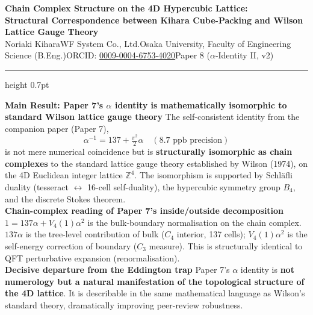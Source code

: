 \documentclass[9pt,a4paper]{article}
\begin{document}
\begin{center}
{\Large\bfseries Chain Complex Structure on the 4D Hypercubic Lattice:\\ Structural Correspondence between Kihara Cube-Packing and Wilson Lattice Gauge Theory}\\[2pt]
{\small Noriaki Kihara\enspace WF System Co., Ltd.\enspace Osaka University, Faculty of Engineering Science (B.Eng.)\enspace ORCID: \href{https://orcid.org/0009-0004-6753-4020}{0009-0004-6753-4020}\enspace Paper 8 ($\alpha$-Identity II, v2)}
\end{center}

\vspace{-1pt}
\hrule height 0.7pt
\vspace{4pt}

\begin{tcolorbox}[colback=gray!7,colframe=gray!55,boxrule=0.4pt,arc=2pt,left=4pt,right=4pt,top=2pt,bottom=2pt]
{\small
\textbf{Main Result: Paper 7's $\alpha$ identity is mathematically isomorphic to standard Wilson lattice gauge theory}\enspace
The self-consistent identity from the companion paper (Paper 7),
\[ \alpha^{-1} = 137 + \tfrac{\pi^2}{2}\alpha \quad (\text{8.7 ppb precision}) \]
is not mere numerical coincidence but is \textbf{structurally isomorphic as chain complexes} to the standard lattice gauge theory established by Wilson (1974), on the 4D Euclidean integer lattice $\mathbb{Z}^4$. The isomorphism is supported by Schl\"afli duality (tesseract $\leftrightarrow$ 16-cell self-duality), the hypercubic symmetry group $B_4$, and the discrete Stokes theorem.\\[2pt]
\textbf{Chain-complex reading of Paper 7's inside/outside decomposition}\enspace
$1 = 137\alpha + V_4(1)\alpha^2$ is the bulk-boundary normalisation on the chain complex. $137\alpha$ is the tree-level contribution of bulk ($C_4$ interior, 137 cells); $V_4(1)\alpha^2$ is the self-energy correction of boundary ($C_3$ measure). This is structurally identical to QFT perturbative expansion (renormalisation).\\[2pt]
\textbf{Decisive departure from the Eddington trap}\enspace
Paper 7's $\alpha$ identity is \textbf{not numerology but a natural manifestation of the topological structure of the 4D lattice}. It is describable in the same mathematical language as Wilson's standard theory, dramatically improving peer-review robustness.}
\end{tcolorbox}

\vspace{2pt}
\end{document}
